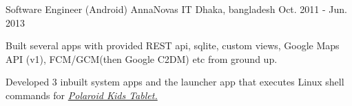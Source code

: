 \begin{cventries}
  \cventry
    {Software Engineer (Android)} %
    {AnnaNovas IT} %
    {Dhaka, bangladesh} %
    {Oct. 2011 - Jun. 2013} %
    {
      \begin{cvitems} %
        \item {Built several apps with provided REST api, sqlite, custom views, Google Maps API (v1), FCM/GCM(then Google C2DM) etc from ground up.}
        \item {Developed 3 inbuilt system apps and the launcher app that executes Linux shell commands for }{\href{https://www.polaroid.com/kids-tablet-2}{\textsl{Polaroid Kids Tablet.}}}
      \end{cvitems}
    }

\end{cventries}
